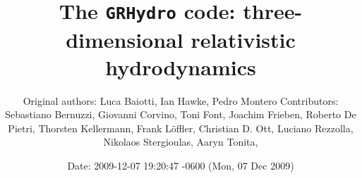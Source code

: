 \documentclass{article}
\begin{document}
\title{The {\tt GRHydro} code: three-dimensional relativistic hydrodynamics}

\author{Original authors: Luca Baiotti, Ian Hawke, Pedro Montero \cr Contributors: 
  Sebastiano Bernuzzi, Giovanni Corvino, Toni Font, Joachim Frieben, \cr Roberto De Pietri, Thorsten
  Kellermann, Frank L\"offler, Christian D. Ott, \cr Luciano Rezzolla, Nikolaos Stergioulas, Aaryn
  Tonita,   }

\date{Date: 2009-12-07 19:20:47 -0600 (Mon, 07 Dec 2009)}
\maketitle
\end{document}
